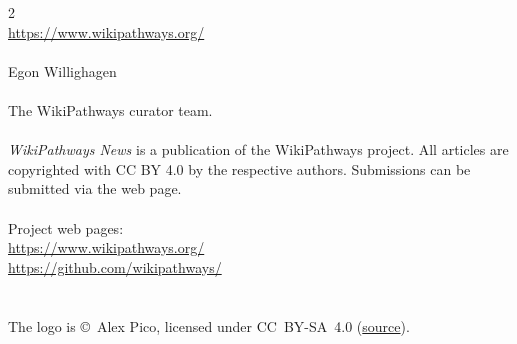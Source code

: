 \documentclass[a4paper]{report}
\begin{document}
\date{September 2026}

\titlepage

\begin{article}
  
\end{article}

\newpage

\begin{article}
  
\end{article}

\newpage

\begin{article}
  
\end{article}

\newpage

\begin{article}
  
\end{article}

\begin{bottombox}
\begin{multicols}{2}
\\
\url{https://www.wikipathways.org/} \\
\\
Egon Willighagen \\
\\
The WikiPathways curator team.\\
\\
\emph{WikiPathways News} is a publication of the WikiPathways project.
All articles are copyrighted with CC BY 4.0 by the respective authors.
Submissions can be submitted via the web page.\\
\\
\WP Project web pages:\\
\url{https://www.wikipathways.org/} \\
\url{https://github.com/wikipathways/}\\
\\
\\
The \WP logo is \copyright\ Alex Pico, licensed under
CC~BY-SA~4.0 (\href{https://commons.wikimedia.org/wiki/File:Wplogo_500.png}{source}).
\end{multicols}
\end{bottombox}
\end{document}
